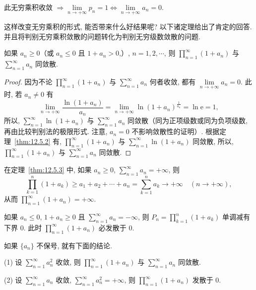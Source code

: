 此无穷乘积收敛 $\Rightarrow\lim\limits_{n\to+\infty}p_{n}=1\Leftrightarrow\lim\limits_{n\to+\infty}a_{n}=0$.

这样改变无穷乘积的形式, 能否带来什么好结果呢? 以下诸定理给出了肯定的回答. 并且将判别无穷乘积敛散的问题转化为判别无穷级数敛散的问题.

\begin{theorem}\label{thm:12.5.3}
如果 $a_{n}\geqslant0$（或 $a_{n}\leqslant0$ 且 $1+a_{n}>0$,）, $n=1,2,\cdots$, 则 $\prod_{n=1}^{\infty}(1+a_{n})$ 与 $\sum_{n=1}^{\infty}a_{n}$ 同敛散.
\end{theorem}

\begin{proof}
因为不论 $\prod_{n=1}^{\infty}(1+a_{n})$ 与 $\sum_{n=1}^{\infty}a_{n}$ 何者收敛, 都有 $\lim\limits_{n\to+\infty}a_{n}=0$. 此时, 若 $a_{n}\neq0$ 有
\[
  \lim_{n\to+\infty}\frac{\ln(1+a_{n})}{a_{n}}=\lim_{n\to+\infty}\ln(1+a_{n})^{\frac{1}{a_{n}}}=\ln\mathrm{e}=1,
\]
所以, $\sum_{n=1}^{\infty}\ln(1+a_{n})$ 与 $\sum_{n=1}^{\infty}a_{n}$ 同敛散（同为正项级数或同为负项级数, 再由比较判别法的极限形式. 注意, $a_{n}=0$ 不影响敛散性的证明）. 根据定理~\ref{thm:12.5.2} 有, $\prod_{n=1}^{\infty}(1+a_{n})$ 与 $\sum_{n=1}^{\infty}\ln(1+a_{n})$ 同敛散, 所以, $\prod_{n=1}^{\infty}(1+a_{n})$ 与 $\sum_{n=1}^{\infty}a_{n}$ 同敛散.
\end{proof}

\begin{remark}\label{rem:12.5.1}
在定理~\ref{thm:12.5.3} 中, 如果 $a_{n}\geqslant0$, $\sum_{n=1}^{\infty}a_{n}=+\infty$, 则
\[
  \prod_{k=1}^{n}(1+a_{k})\geqslant a_{1}+a_{2}+\cdots+a_{n}=\sum_{k=1}^{n}a_{k}\to+\infty\quad(n\to+\infty),
\]
从而 $\prod_{n=1}^{\infty}(1+a_{n})=+\infty$.

如果 $a_{n}\leqslant0$, $1+a_{n}\geqslant0$ 且 $\sum_{n=1}^{\infty}a_{n}=-\infty$, 则 $P_{n}=\prod_{k=1}^{n}(1+a_{k})$ 单调减有下界 $0$. 此时 $\prod_{n=1}^{\infty}(1+a_{n})$ 必发散于 $0$.

如果 $\{a_{n}\}$ 不保号, 就有下面的结论.
\end{remark}

\begin{theorem}\label{thm:12.5.4}
(1) 设 $\sum_{n=1}^{\infty}a_{n}^{2}$ 收敛, 则 $\prod_{n=1}^{\infty}(1+a_{n})$ 与 $\sum_{n=1}^{\infty}a_{n}$ 同敛散.

(2) 设 $\sum_{n=1}^{\infty}a_{n}$ 收敛, $\sum_{n=1}^{\infty}a_{n}^{2}=+\infty$, 则 $\prod_{n=1}^{\infty}(1+a_{n})$ 发散于 $0$.
\end{theorem}

